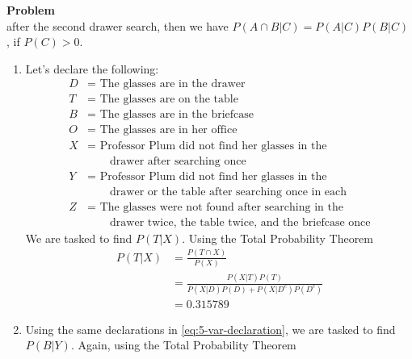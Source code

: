 \documentclass[12pt]{article}
\newenvironment{Ex}{\textbf{Problem}\vspace{.75em}\\}{}
\begin{document}
\begin{enumerate}
\begin{Ex}
    after the second drawer search, then we have $P(A \cap B | C) =
    P(A|C)P(B|C)$ , if $P(C) > 0$.
    \begin{solution} \hfill
      \begin{enumerate}
      \item Let's declare the following:
        \begin{equation}
          \label{eq:5-var-declaration}
          \begin{aligned}
            D &= \text{ The glasses are in the drawer} \\
            T &= \text{ The glasses are on the table} \\
            B &= \text{ The glasses are in the briefcase} \\
            O &= \text{ The glasses are in her office} \\
            X &= \text{ Professor Plum did not find her glasses in
              the} \\
            &\quad\quad\text{drawer after searching once} \\
            Y &= \text{ Professor Plum did not find her glasses in
              the} \\
            &\quad\quad\text{drawer or the table after searching once
              in each} \\
            Z &= \text{ The glasses were not found after searching in
              the} \\
            &\quad\quad\text{drawer twice, the table twice, and the briefcase once}
          \end{aligned}
        \end{equation}
        We are tasked to find $P(T | X)$. Using the Total Probability Theorem
        \begin{equation}
          \label{eq:5a-sol}
          \begin{aligned}
            P(T | X) &= \frac{P(T \cap X)}{P(X)} \\
            &= \frac{P(X|T)P(T)}{P(X|D)P(D) + P(X|D^c)P(D^c)} \\
            &= 0.315789
          \end{aligned}
        \end{equation}
      \item Using the same declarations in
        \cref{eq:5-var-declaration}, we are tasked to find
        $P(B|Y)$. Again, using the Total Probability Theorem
        \begin{equation}
          \label{eq:5b-sol}
          \begin{aligned}

\end{aligned}
\end{equation}
\end{enumerate}
\end{solution}
\end{Ex}
\end{enumerate}
\end{document}
